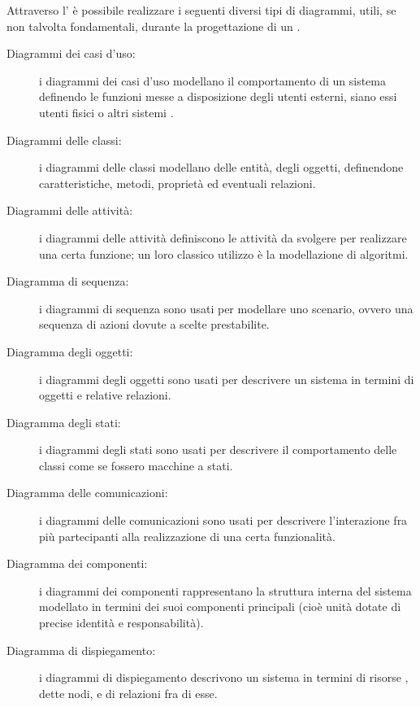Attraverso l' è possibile realizzare i seguenti diversi tipi di diagrammi, utili, se non talvolta fondamentali, durante la progettazione di un .
\begin{description}
\item[Diagrammi dei casi d'uso:] i diagrammi dei casi d'uso modellano il comportamento di un sistema definendo le funzioni messe a disposizione degli utenti esterni, siano essi utenti fisici o altri sistemi .
\item[Diagrammi delle classi:] i diagrammi delle classi modellano delle entità, degli oggetti, definendone caratteristiche, metodi, proprietà ed eventuali relazioni.
\item[Diagrammi delle attività:] i diagrammi delle attività definiscono le attività da svolgere per realizzare una certa funzione; un loro classico utilizzo è la modellazione di algoritmi.
\item[Diagramma di sequenza:] i diagrammi di sequenza sono usati per modellare uno scenario, ovvero una sequenza di azioni dovute a scelte prestabilite.
\item[Diagramma degli oggetti:] i diagrammi degli oggetti sono usati per descrivere un sistema in termini di oggetti e relative relazioni.
\item[Diagramma degli stati:] i diagrammi degli stati sono usati per descrivere il comportamento delle classi come se fossero macchine a stati.
\item[Diagramma delle comunicazioni:] i diagrammi delle comunicazioni sono usati per descrivere l'interazione fra più partecipanti alla realizzazione di una certa funzionalità.
\item[Diagramma dei componenti:] i diagrammi dei componenti rappresentano la struttura interna del sistema  modellato in termini dei suoi componenti principali (cioè unità  dotate di precise identità e responsabilità).
\item[Diagramma di dispiegamento:] i diagrammi di dispiegamento descrivono un sistema in termini di risorse , dette nodi, e di relazioni fra di esse.
\end{description}
